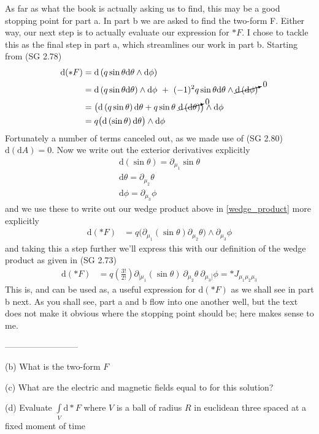 As far as what the book is actually asking us to find, this may be a good stopping point for part a. In part b we are asked to find the two-form F. Either way, our next step is to actually evaluate our expression for $\ast F$. I chose to tackle this as the final step in part a, which streamlines our work in part b. Starting from (SG 2.78) 
%
\begin{align}
	\textrm{d} (\ast F) &= \textrm{d} \left( q  \sin{\theta}  \textrm{d} \theta  \wedge  \textrm{d} \phi \right)\\
	 &= \textrm{d} \left( q  \sin{\theta}  \textrm{d} \theta \right)  \wedge  \textrm{d} \phi \ + \ (-1)^2 q  \sin{\theta}  \textrm{d} \theta \wedge \cancelto{0}{\textrm{d} \left(\textrm{d} \phi\right)}\\
	 &= \big( \textrm{d}  \left( q  \sin{\theta} \right)  \textrm{d} \theta + q  \sin{\theta} \ \cancelto{0}{\textrm{d} \left( \textrm{d} \theta \right)} \big) \wedge  \textrm{d} \phi\\
	 \label{wedge_product}&= q \big( \textrm{d} \left(\sin{\theta} \right)  \textrm{d} \theta \big) \wedge  \textrm{d} \phi
\end{align} 
%
Fortunately a number of terms canceled out, as we made use of (SG 2.80) $\textrm{d} \left( \textrm{d} A \right) = 0$. Now we write out the exterior derivatives explicitly
%
\begin{align}
\textrm{d} \left(\sin{\theta} \right) = \partial_{\mu_1} \sin{\theta} \\
\textrm{d} \theta = \partial_{\mu_2} \theta\\
\textrm{d} \phi = \partial_{\mu_3}\phi
\end{align} 
%
and we use these to write out our wedge product above in \ref{wedge_product} more explicitly
%
\begin{align}
 \textrm{d} (\ast F) &= q \big( \partial_{\mu_1} \left(\sin{\theta}\right)  \partial_{\mu_2} \theta \big) \wedge  \partial_{\mu_3}\phi
\end{align} 
%
and taking this a step further we'll express this with our definition of the wedge product as given in (SG 2.73)
%
\begin{align}
	\textrm{d} (\ast F) &= q \left( \frac{3!}{2!} \right)\partial_{[\mu_1} \left(\sin{\theta}\right) \ \partial_{\mu_2} \theta \ \partial_{\mu_3]}\phi = \ast J_{\mu_1\mu_2\mu_3} 
\end{align} 
%
This is, and can be used as, a useful expression for $\textrm{d} (\ast F)$ as we shall see in part b next. As you shall see, part a and b flow into one another well, but the text does not make it obvious where the stopping point should be; here makes sense to me. 

--------------------------

(b) What is the two-form $F$ 

(c) What are the electric and magnetic fields equal to for this solution? 

(d) Evaluate $ \int\limits_{V} \textrm{d} \ast F $ where $V$ is a ball of radius $R$ in euclidean three spaced at a fixed moment of time
